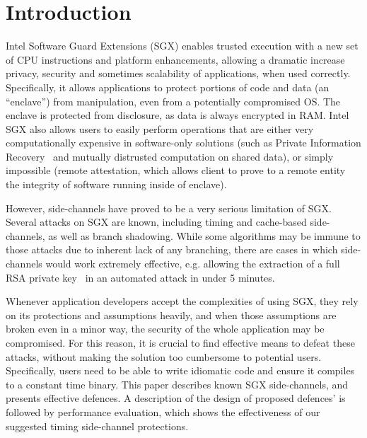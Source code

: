 \documentclass[sigplan, review]{acmart}
\begin{document}
\section{Introduction}
Intel Software Guard Extensions (SGX) enables trusted execution with a new set of CPU instructions and platform enhancements, allowing a dramatic increase privacy, security and sometimes scalability of applications, when used correctly. Specifically, it allows applications to protect portions of code and data (an ``enclave'') from manipulation, even from a potentially compromised OS. The enclave is protected from disclosure, as data is always encrypted in RAM. Intel SGX also allows users to easily perform operations that are either very computationally expensive in software-only solutions (such as Private Information Recovery~\cite{signalprivaterecovery} and mutually distrusted computation on shared data), or simply impossible (remote attestation, which allows client to prove to a remote entity the integrity of software running inside of enclave).

However, side-channels have proved to be a very serious limitation of SGX. Several attacks on SGX are known, including timing and cache-based side-channels, as well as branch shadowing. While some algorithms may be immune to those attacks due to inherent lack of any branching, there are cases in which side-channels would work extremely effective, e.g. allowing the extraction of a full RSA private key~\cite{schwarz2017malware} in an automated attack in under 5 minutes.

Whenever application developers accept the complexities of using SGX, they rely on its protections and assumptions heavily, and when those assumptions are broken even in a minor way, the security of the whole application may be compromised. For this reason, it is crucial to find effective means to defeat these attacks, without making the solution too cumbersome to potential users. Specifically, users need to be able to write idiomatic code and ensure it compiles to a constant time binary.
This paper describes known SGX side-channels, and presents effective defences. A description of the design of proposed defences' is followed by performance evaluation, which shows the effectiveness of our suggested timing side-channel protections.
\end{document}
